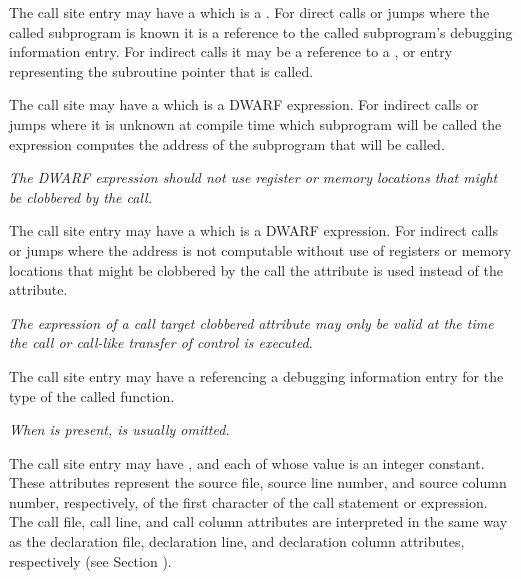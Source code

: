 The call site entry may have a
\DWATcalloriginDEFN{}
which is a \CLASSreference.  For direct calls or jumps where the called
subprogram is known it is a reference to the called subprogram's debugging
information entry.  For indirect calls it may be a reference to a
\DWTAGvariable{}, \DWTAGformalparameter{} or \DWTAGmember{} entry representing
the subroutine pointer that is called.

The call site may have a
\DWATcalltargetDEFN{}
 which is
a DWARF expression.  For indirect calls or jumps where it is unknown at
compile time which subprogram will be called the expression computes the
address of the subprogram that will be called.

\textit{The DWARF expression should
not use register or memory locations that might be clobbered by the call.}

The call site entry may have a
\DWATcalltargetclobberedDEFN{}
which is a DWARF expression.  For indirect calls or jumps where the
address is not computable without use of registers or memory locations that
might be clobbered by the call the \DWATcalltargetclobberedNAME{}
attribute is used instead of the \DWATcalltarget{} attribute.

\textit{The expression of a call target clobbered attribute may only be
valid at the time the call or call-like transfer of control is executed.}

The call site entry may have a \DWATtypeDEFN{}
referencing a debugging information entry for the type of the called function.

\textit{When \DWATcallorigin{} is present, \DWATtypeNAME{} is usually omitted.}

The call site entry may have
\DWATcallfileDEFN{},
\DWATcalllineDEFN{} and
\DWATcallcolumnDEFN{}
each of whose value is an integer constant.
These attributes represent the source file, source line number, and source
column number, respectively, of the first character of the call statement or
expression.  The call file, call line, and call column attributes are
interpreted in the same way as the declaration file, declaration
line, and declaration column attributes, respectively
(see Section ).

